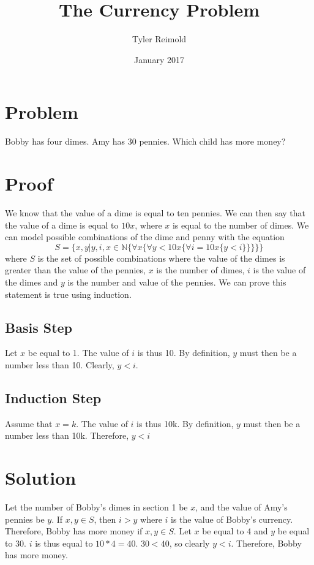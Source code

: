 \documentclass{article}
\title{The Currency Problem}
\author{Tyler Reimold }
\date{January 2017}
\begin{document}
\maketitle

\section{Problem}
Bobby has four dimes. Amy has 30 pennies. Which child has more money?
\section{Proof}
We know that the value of a dime is equal to ten pennies. We can then say that the value of a dime is equal to $10x$, where $x$ is equal to the number of dimes. We can model possible combinations of the dime and penny with the equation $$S=\{x, y | y,i,x \in \mathbb{N}\{\forall x\{\forall y < 10x\{\forall i =10x\{ y < i \}\}\}\}\} $$
where $S$ is the set of possible combinations where the value of the dimes is greater than the value of the pennies, $x$ is the number of dimes, $i$ is the value of the dimes and $y$ is the number and value of the pennies. We can prove this statement is true using induction.
\subsection{Basis Step}
Let $x$ be equal to 1. The value of $i$ is thus 10. By definition, $y$ must then be a number less than 10. Clearly, $y < i$.
\subsection{Induction Step}
Assume that $x = k$. The value of $i$ is thus 10k. By definition, $y$ must then be a number less than 10k. Therefore, $y < i$
\section{Solution}
Let the number of Bobby's dimes in section 1 be $x$, and the value of Amy's pennies be $y$. If $x,y\in S$, then $i > y$ where $i$ is the value of Bobby's currency. Therefore, Bobby has more money if $x,y\in S$. Let $x$ be equal to 4 and $y$ be equal to 30. $i$ is thus equal to $10 * 4 = 40$. $30 < 40$, so clearly $y < i$. Therefore, Bobby has more money.
\end{document}
